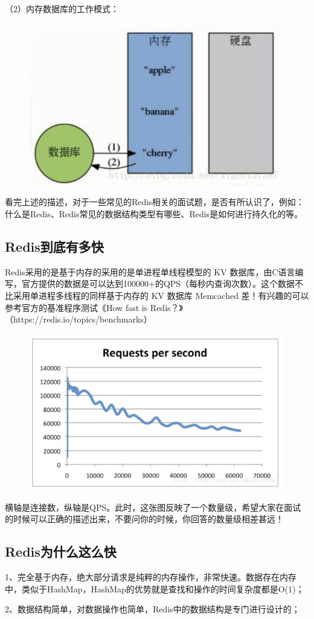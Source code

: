 \documentclass[12pt]{article}
\begin{document}
（2）内存数据库的工作模式：
\begin{figure}[H]
    \centering
    \includegraphics[width=.5\textwidth]{fig/Redis_Fast_2.png}
\end{figure}

看完上述的描述，对于一些常见的Redis相关的面试题，是否有所认识了，例如：什么是Redis、Redis常见的数据结构类型有哪些、Redis是如何进行持久化的等。

\subsection{Redis到底有多快}
Redis采用的是基于内存的采用的是单进程单线程模型的 KV 数据库，由C语言编写，官方提供的数据是可以达到100000+的QPS（每秒内查询次数）。这个数据不比采用单进程多线程的同样基于内存的 KV 数据库 Memcached 差！有兴趣的可以参考官方的基准程序测试《How fast is Redis？》（https://redis.io/topics/benchmarks）
\begin{figure}[H]
    \centering
    \includegraphics[width=.5\textwidth]{fig/Redis_Fast_3.png}
\end{figure}

横轴是连接数，纵轴是QPS。此时，这张图反映了一个数量级，希望大家在面试的时候可以正确的描述出来，不要问你的时候，你回答的数量级相差甚远！

\subsection{Redis为什么这么快}
1、完全基于内存，绝大部分请求是纯粹的内存操作，非常快速。数据存在内存中，类似于HashMap，HashMap的优势就是查找和操作的时间复杂度都是O(1)；

2、数据结构简单，对数据操作也简单，Redis中的数据结构是专门进行设计的；
\end{document}
